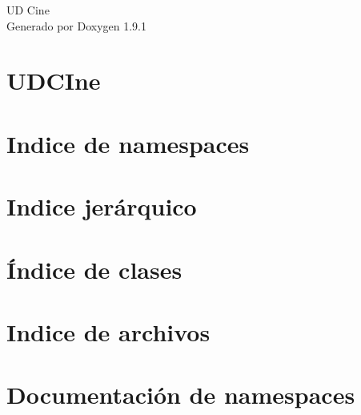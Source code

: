 \let\mypdfximage\pdfximage\def\pdfximage{\immediate\mypdfximage}\documentclass[twoside]{book}
\newcommand{\+}{\discretionary{\mbox{\scriptsize$\hookleftarrow$}}{}{}}
\newcommand{\clearemptydoublepage}{%
  \newpage{\pagestyle{empty}\cleardoublepage}%
}
\begin{document}
\raggedbottom

\begin{titlepage}
\vspace*{7cm}
\begin{center}%
{\Large UD Cine }\\
\vspace*{1cm}
{\large Generado por Doxygen 1.9.1}\\
\end{center}
\end{titlepage}
\clearemptydoublepage
{}
\tableofcontents
\clearemptydoublepage
{}

\chapter{UDCIne}
\label{md__r_e_a_d_m_e}

\chapter{Indice de namespaces}

\chapter{Indice jerárquico}

\chapter{Índice de clases}

\chapter{Indice de archivos}

\chapter{Documentación de namespaces}





\end{document}
